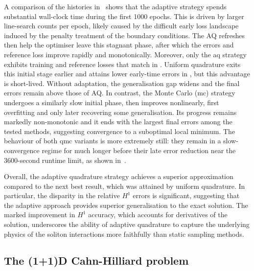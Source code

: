 \documentclass[oneside,reqno,11pt,a4paper]{amsart}
\theoremstyle{definition}
\begin{document}
A comparison of the histories in~ shows that
the adaptive strategy spends
substantial wall-clock time during the first \num{1000} epochs. This is driven by larger
line-search counts per epoch, likely caused by the difficult early loss
landscape induced by the penalty treatment of the boundary conditions. The AQ
refreshes then help the optimiser leave this stagnant phase, after which the
errors and reference loss improve rapidly and monotonically. Moreover, only the
\ac{aq} strategy exhibits training and reference losses that match in
. Uniform quadrature exits this initial stage
earlier and attains lower early-time errors in
, but this advantage is short-lived. Without
adaptation, the generalisation gap widens and the final errors remain above
those of AQ. In contrast, the Monte Carlo
(\ac{mc}) strategy undergoes a similarly slow initial phase, then improves
nonlinearly, first overfitting and only later recovering some
generalisation. Its progress remains markedly non-monotonic and it ends with
the largest final errors among the tested methods, suggesting convergence to a
suboptimal local minimum. The behaviour of both \ac{qmc} variants is more
extremely still: they remain in a slow-convergence regime for much longer before
their late error reduction near the \num{3600}-second runtime limit, as shown
in~.

Overall, the adaptive quadrature strategy achieves a superior approximation
compared to the next best result, which was attained by uniform quadrature. In
particular, the disparity in the relative $H^1$ errors is significant,
suggesting that the adaptive approach provides superior generalisation to the
exact solution. The marked improvement in $H^1$ accuracy, which accounts for
derivatives of the solution, underscores the ability of adaptive quadrature to
capture the underlying physics of the soliton interactions more faithfully than
static sampling methods.


\subsection{The (1+1)D Cahn-Hilliard problem}
\end{document}
